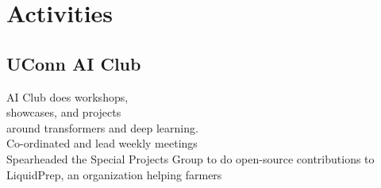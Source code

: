 \documentclass[]{resume-template}
\begin{document}
\begin{minipage}[t]{0.33\textwidth}
        \section{Activities}\label{sec:activities}

        \subsection{UConn AI Club}\label{subsec:uconn-ai-club}
        \textbullet{} AI Club does workshops,\\showcases, and projects \\around transformers and deep learning.\\
        \textbullet{} Co-ordinated and lead weekly meetings\\
        \textbullet{} Spearheaded the Special Projects Group to do open-source contributions to LiquidPrep, an organization helping farmers

        \vspace{\topsep}







\end{minipage}
\end{document}
